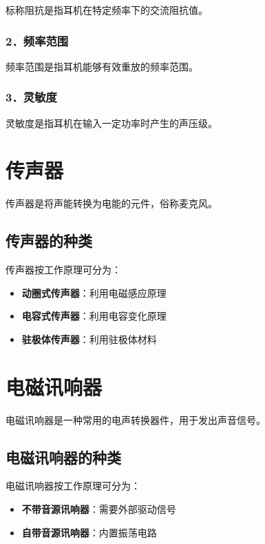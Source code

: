 \documentclass[12pt,UTF8]{ctexbook}
\begin{document}
标称阻抗是指耳机在特定频率下的交流阻抗值。

\subsubsection{2．频率范围}

频率范围是指耳机能够有效重放的频率范围。

\subsubsection{3．灵敏度}

灵敏度是指耳机在输入一定功率时产生的声压级。

\section{传声器}

传声器是将声能转换为电能的元件，俗称麦克风。

\subsection{传声器的种类}

传声器按工作原理可分为：

\begin{itemize}[leftmargin=2cm]
	\item \textbf{动圈式传声器}：利用电磁感应原理
	\item \textbf{电容式传声器}：利用电容变化原理
	\item \textbf{驻极体传声器}：利用驻极体材料
\end{itemize}

\section{电磁讯响器}

电磁讯响器是一种常用的电声转换器件，用于发出声音信号。

\subsection{电磁讯响器的种类}

电磁讯响器按工作原理可分为：

\begin{itemize}[leftmargin=2cm]
	\item \textbf{不带音源讯响器}：需要外部驱动信号
	\item \textbf{自带音源讯响器}：内置振荡电路
\end{itemize}
\end{document}
